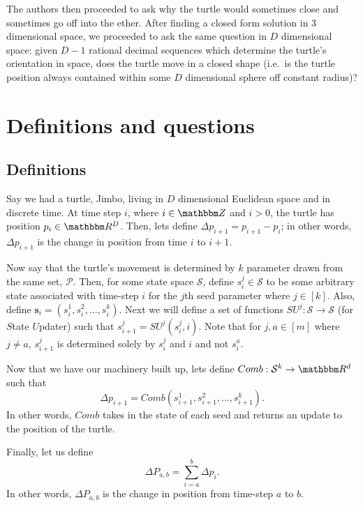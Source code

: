 \documentclass[11pt,titlepage]{article}
\newcommand{\combWithState}[1]{Comb\left(s^1_{#1}, s^2_{#1}, ..., s^k_{#1}\right)}
\begin{document}
The authors then proceeded to ask why the turtle would sometimes close and sometimes
go off into the ether. After finding a closed form solution in 3 dimensional space,
we proceeded to ask the same question in $D$ dimensional space: given $D - 1$ 
rational decimal sequences which determine the turtle's orientation in space,
does the turtle move in a closed shape (i.e.\ is the turtle position always contained
within some $D$ dimensional sphere off constant radius)?

\pagebreak

\section{Definitions and questions}
\subsection{Definitions}
Say we had a turtle, Jimbo, living in $D$ dimensional Euclidean
space and in discrete time. At time step $i$, where $i \in \Z$ and $i > 0$,
the turtle has position $p_i \in \R^D$.
Then, lets define $\Delta p_{i+1} = p_{i+1} - p_i$; in other words, $\Delta p_{i+1}$ is the change in position from time $i$ to $i + 1$.

Now say that the turtle's movement is determined by $k$ parameter drawn from
the same set, $\mathcal{P}$. Then, for some state space $\mathcal{S}$,
define $s_i^j \in \mathcal{S}$ to be some arbitrary
state associated with time-step $i$ for the $j$th seed parameter where $j \in [k]$.
Also, define $\pmb{s}_i = (s_i^1, s_i^2, ..., s_i^k)$.
Next we will define a set of functions $SU^j: \mathcal{S} \rightarrow \mathcal{S}$
(for $S$tate $U$pdater) such that $s_{i + 1}^j = SU^j(s_i^j, i)$. Note that for
$j, a \in [m]$ where $j \neq a$, $s_{i+1}^j$ is determined solely by $s_i^j$ and $i$ and not
$s_i^a$.

Now that we have our machinery built up, lets define $Comb: \mathcal{S}^k \rightarrow \R^d$ such that
$$
  \Delta p_{i + 1} = \combWithState{i + 1}.
$$
In other words, $Comb$ takes in the state of each seed and
returns an update to the position of the turtle.

Finally, let us define
$$
  \Delta P_{a, b} = \sum_{i = a}^{b} \Delta p_i.
$$
In other words, $\Delta P_{a, b}$ is the change in position from time-step $a$ to $b$.
\end{document}
